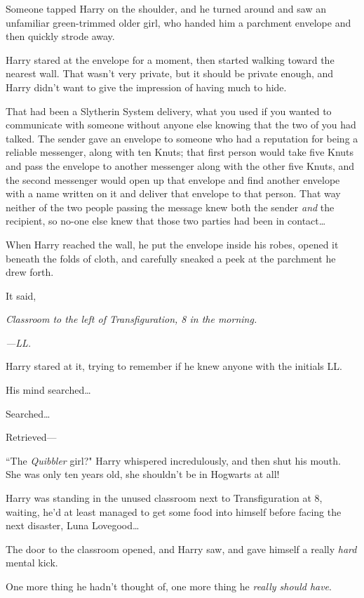 Someone tapped Harry on the shoulder, and he turned around and saw an unfamiliar green-trimmed older girl, who handed him a parchment envelope and then quickly strode away.

Harry stared at the envelope for a moment, then started walking toward the nearest wall. That wasn't very private, but it should be private enough, and Harry didn't want to give the impression of having much to hide.

That had been a Slytherin System delivery, what you used if you wanted to communicate with someone without anyone else knowing that the two of you had talked. The sender gave an envelope to someone who had a reputation for being a reliable messenger, along with ten Knuts; that first person would take five Knuts and pass the envelope to another messenger along with the other five Knuts, and the second messenger would open up that envelope and find another envelope with a name written on it and deliver that envelope to that person. That way neither of the two people passing the message knew both the sender \emph{and} the recipient, so no-one else knew that those two parties had been in contact{\ldots}

When Harry reached the wall, he put the envelope inside his robes, opened it beneath the folds of cloth, and carefully sneaked a peek at the parchment he drew forth.

It said,

\emph{Classroom to the left of Transfiguration, 8 in the morning.}

\emph{—LL.}

Harry stared at it, trying to remember if he knew anyone with the initials LL.

His mind searched{\ldots}

Searched{\ldots}

Retrieved—

``The \emph{Quibbler} girl?" Harry whispered incredulously, and then shut his mouth. She was only ten years old, she shouldn't be in Hogwarts at all!


Harry was standing in the unused classroom next to Transfiguration at 8\am, waiting, he'd at least managed to get some food into himself before facing the next disaster, Luna Lovegood{\ldots}

The door to the classroom opened, and Harry saw, and gave himself a really \emph{hard} mental kick.

One more thing he hadn't thought of, one more thing he \emph{really should have}.

